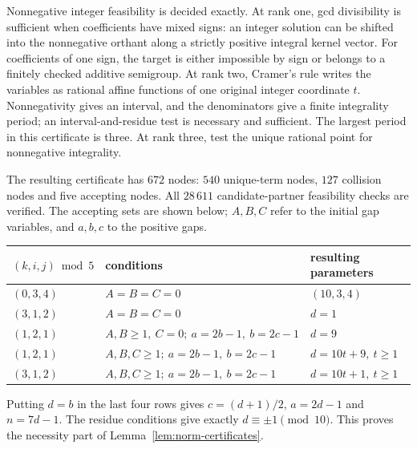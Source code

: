 \documentclass[11pt]{article}
\theoremstyle{definition}
\theoremstyle{remark}
\begin{document}
Nonnegative integer feasibility is decided exactly.
At rank one, gcd divisibility is sufficient when coefficients have
mixed signs: an integer solution can be shifted into the nonnegative
orthant along a strictly positive integral kernel vector.
For coefficients of one sign, the target is either impossible by
sign or belongs to a finitely checked additive semigroup.
At rank two, Cramer's rule writes the variables as rational affine
functions of one original integer coordinate $t$.
Nonnegativity gives an interval, and the denominators give a finite
integrality period; an interval-and-residue test is necessary and
sufficient. The largest period in this certificate is three.
At rank three, test the unique rational point for nonnegative
integrality.

The resulting certificate has $672$ nodes: $540$ unique-term
nodes, $127$ collision nodes and five accepting nodes.
All $28\,611$ candidate-partner feasibility checks are verified.
The accepting sets are shown below; $A,B,C$ refer to the initial
gap variables, and $a,b,c$ to the positive gaps.
\begin{center}\small
\begin{tabular}{lll}
\toprule
$(k,i,j)\bmod5$ & conditions & resulting parameters\\
\midrule
$(0,3,4)$ & $A=B=C=0$ & $(10,3,4)$\\
$(3,1,2)$ & $A=B=C=0$ & $d=1$\\
$(1,2,1)$ & $A,B\ge1,\ C=0;\ a=2b-1,\ b=2c-1$ & $d=9$\\
$(1,2,1)$ & $A,B,C\ge1;\ a=2b-1,\ b=2c-1$ & $d=10t+9,\ t\ge1$\\
$(3,1,2)$ & $A,B,C\ge1;\ a=2b-1,\ b=2c-1$ & $d=10t+1,\ t\ge1$\\
\bottomrule
\end{tabular}
\end{center}
Putting $d=b$ in the last four rows gives
$c=(d+1)/2$, $a=2d-1$ and $n=7d-1$.
The residue conditions give exactly $d\equiv\pm1\pmod {10}$.
This proves the necessity part of Lemma~\ref{lem:norm-certificates}.
\end{document}
